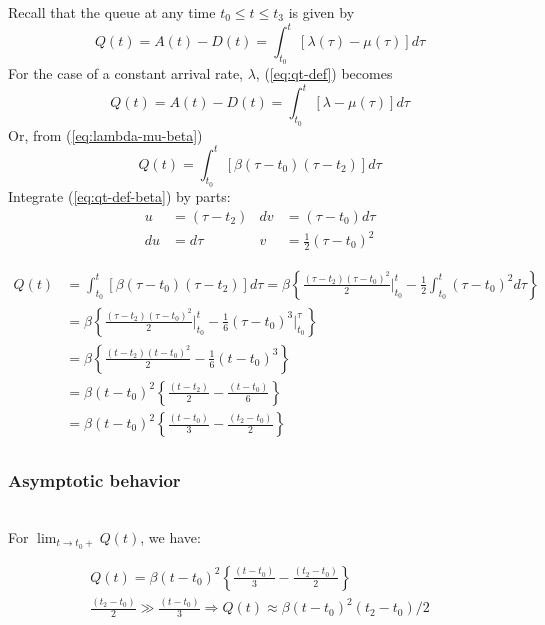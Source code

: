 \documentclass[12pt]{report}
\newcounter{time}
\begin{document}
Recall that the queue at any time $t_0 \le t \le t_3$  is given by
\begin{equation}
  \label{eq:qt-def}
  Q(t)=A(t)-D(t)=\int_{t_0}^t\left[\lambda(\tau)-\mu(\tau)\right]d\tau
\end{equation}
For the case of a constant arrival rate, $\lambda$, (\ref{eq:qt-def})
becomes
\begin{equation}
  \label{eq:qt-def-2}
  Q(t)=A(t)-D(t)=\int_{t_0}^t\left[\lambda-\mu(\tau)\right]d\tau
\end{equation}
Or, from (\ref{eq:lambda-mu-beta})
\begin{equation}
  \label{eq:qt-def-beta}
  Q(t)=\int_{t_0}^t\left[\beta(\tau-t_0)(\tau-t_2)\right]d\tau
\end{equation}
Integrate (\ref{eq:qt-def-beta}) by parts:
\begin{align*}
  u & = (\tau-t_2) & dv & = (\tau-t_0)d\tau\\
  du & = d\tau & v & = \frac{1}{2}(\tau - t_0)^2
\end{align*}

\begin{equation}
  \label{eq:qt-final}
  \begin{split}
    Q(t) & =\int_{t_0}^t\left[\beta(\tau-t_0)(\tau-t_2)\right]d\tau
    = \beta\left\{\frac{(\tau-t_2)(\tau-t_0)^2}{2}\Biggr\rvert_{t_0}^{t}
      - \frac{1}{2}\int_{t_0}^t(\tau-t_0)^2d\tau\right\}\\
    &= \beta\left\{\frac{(\tau-t_2)(\tau-t_0)^2}{2}\Biggr\rvert_{t_0}^{t}
      - \frac{1}{6}(\tau-t_0)^3\Biggr\rvert_{t_0}^{\tau}\right\}\\ 
    &= \beta\left\{\frac{(t-t_2)(t-t_0)^2}{2}
      - \frac{1}{6}(t-t_0)^3\right\}\\ 
    &= \beta(t-t_0)^2\left\{\frac{(t-t_2)}{2}
      - \frac{(t-t_0)}{6}\right\}\\ 
    &= \beta(t-t_0)^2\left\{\frac{(t-t_0)}{3}
      - \frac{(t_2-t_0)}{2}\right\}\\ 
  \end{split}
\end{equation}

\subsubsection*{Asymptotic behavior}~\\

For \emph{$\lim_{t\to t_0+} Q(t)$}, we have:

\begin{equation}
  \label{eq:qt-asymp-at-t0}
  \begin{split}
    Q(t) = \beta(t-t_0)^2\left\{\frac{(t-t_0)}{3}
      - \frac{(t_2-t_0)}{2}\right\}\\ 
    \frac{(t_2-t_0)}{2} \gg \frac{(t-t_0)}{3} 
    \Rightarrow Q(t) \approx \beta(t-t_0)^2(t_2-t_0)/2
  \end{split}
\end{equation}
\end{document}
